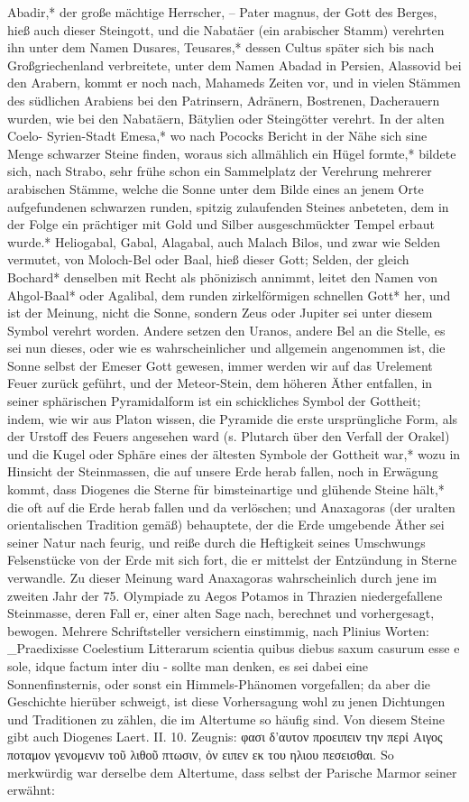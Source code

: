 \documentclass[a4paper, 11pt, oneside, polutonikogreek, german]{article}
\begin{document}
Abadir,* der große mächtige Herrscher, -- Pater magnus, der Gott des Berges, hieß auch dieser Steingott, und die Nabatäer (ein arabischer Stamm) verehrten ihn unter dem Namen Dusares, Teusares,* dessen Cultus später sich bis nach Großgriechenland verbreitete, unter dem Namen Abadad in Persien, Alassovid bei den Arabern, kommt er noch nach, Mahameds Zeiten vor, und in vielen Stämmen des südlichen Arabiens bei den Patrinsern, Adränern, Bostrenen, Dacherauern wurden, wie bei den Nabatäern, Bätylien oder Steingötter verehrt. In der alten Coelo- Syrien-Stadt Emesa,* wo nach Pococks Bericht in der Nähe sich sine Menge schwarzer Steine finden, woraus sich allmählich ein Hügel formte,* bildete sich, nach Strabo, sehr frühe schon ein Sammelplatz der Verehrung mehrerer arabischen Stämme, welche die Sonne unter dem Bilde eines an jenem Orte aufgefundenen schwarzen runden, spitzig zulaufenden Steines anbeteten, dem in der Folge ein prächtiger mit Gold und Silber ausgeschmückter Tempel erbaut wurde.* Heliogabal, Gabal, Alagabal, auch Malach Bilos, und zwar wie Selden vermutet, von Moloch-Bel oder Baal, hieß dieser Gott; Selden, der gleich Bochard* denselben mit Recht als phönizisch annimmt, leitet den Namen von Ahgol-Baal* oder Agalibal, dem runden zirkelförmigen schnellen Gott* her, und ist der Meinung, nicht die Sonne, sondern Zeus oder Jupiter sei unter diesem Symbol verehrt worden. Andere setzen den Uranos, andere Bel an die Stelle, es sei nun dieses, oder wie es wahrscheinlicher und allgemein angenommen ist, die Sonne selbst der Emeser Gott gewesen, immer werden wir auf das Urelement Feuer zurück geführt, und der Meteor-Stein, dem höheren Äther entfallen, in seiner sphärischen Pyramidalform ist ein schickliches Symbol der Gottheit; indem, wie wir aus Platon wissen, die Pyramide die erste ursprüngliche Form, als der Urstoff des Feuers angesehen ward (s. Plutarch über den Verfall der Orakel) und die Kugel oder Sphäre eines der ältesten Symbole der Gottheit war,* wozu in Hinsicht der Steinmassen, die auf unsere Erde herab fallen, noch in Erwägung kommt, dass Diogenes die Sterne für bimsteinartige und glühende Steine hält,* die oft auf die Erde herab fallen und da verlöschen; und Anaxagoras (der uralten orientalischen Tradition gemäß) behauptete, der die Erde umgebende Äther sei seiner Natur nach feurig, und reiße durch die Heftigkeit seines Umschwungs Felsenstücke von der Erde mit sich fort, die er mittelst der Entzündung in Sterne verwandle. Zu dieser Meinung ward Anaxagoras wahrscheinlich durch jene im zweiten Jahr der 75. Olympiade zu Aegos Potamos in Thrazien niedergefallene Steinmasse, deren Fall er, einer alten Sage nach, berechnet und vorhergesagt, bewogen. Mehrere Schriftsteller versichern einstimmig, nach Plinius Worten: _Praedixisse Coelestium Litterarum scientia quibus diebus saxum casurum esse e sole, idque factum inter diu - sollte man denken, es sei dabei eine Sonnenfinsternis, oder sonst ein Himmels-Phänomen vorgefallen; da aber die Geschichte hierüber schweigt, ist diese Vorhersagung wohl zu jenen Dichtungen und Traditionen zu zählen, die im Altertume so häufig sind. Von diesem Steine gibt auch Diogenes Laert. II. 10. Zeugnis: φασι δ'αυτον προειπειν την περἰ Αιγος ποταμον γενομενιν τοῦ λιθοῦ πτωσιν, ὀν ειπεν εκ του ηλιου πεσεισθαι. So merkwürdig war derselbe dem Altertume, dass selbst der Parische Marmor seiner erwähnt:
\end{document}
